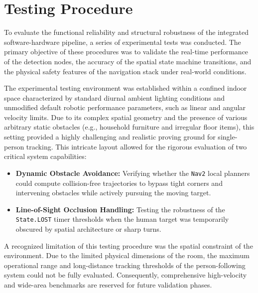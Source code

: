\section{Testing Procedure}
To evaluate the functional reliability and structural robustness of the integrated software-hardware pipeline, a series of experimental tests was conducted. The primary objective of these procedures was to validate the real-time performance of the detection nodes, the accuracy of the spatial state machine transitions, and the physical safety features of the navigation stack under real-world conditions.

The experimental testing environment was established within a confined indoor space characterized by standard diurnal ambient lighting conditions and unmodified default robotic performance parameters, such as linear and angular velocity limits. Due to its complex spatial geometry and the presence of various arbitrary static obstacles (e.g., household furniture and irregular floor items), this setting provided a highly challenging and realistic proving ground for single-person tracking. This intricate layout allowed for the rigorous evaluation of two critical system capabilities:
\begin{itemize}
	\item \textbf{Dynamic Obstacle Avoidance:} Verifying whether the \texttt{Nav2} local planners could compute collision-free trajectories to bypass tight corners and intervening obstacles while actively pursuing the moving target.
	\item \textbf{Line-of-Sight Occlusion Handling:} Testing the robustness of the \texttt{State.LOST} timer thresholds when the human target was temporarily obscured by spatial architecture or sharp turns.
\end{itemize}

A recognized limitation of this testing procedure was the spatial constraint of the environment. Due to the limited physical dimensions of the room, the maximum operational range and long-distance tracking thresholds of the person-following system could not be fully evaluated. Consequently, comprehensive high-velocity and wide-area benchmarks are reserved for future validation phases.
